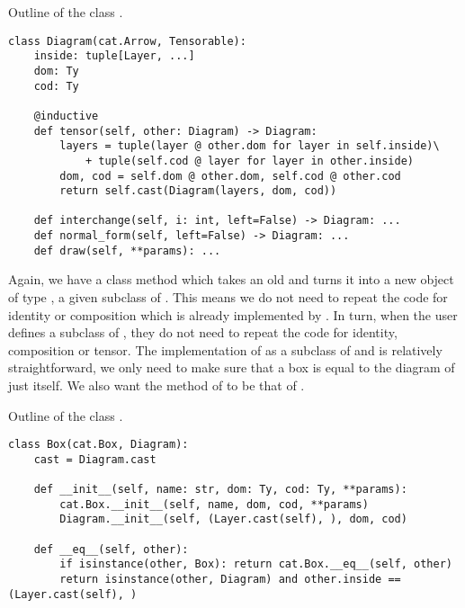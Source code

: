 \begin{python}\label{listing:monoidal.Diagram}
{\normalfont Outline of the class .}

\begin{verbatim}
class Diagram(cat.Arrow, Tensorable):
    inside: tuple[Layer, ...]
    dom: Ty
    cod: Ty

    @inductive
    def tensor(self, other: Diagram) -> Diagram:
        layers = tuple(layer @ other.dom for layer in self.inside)\
            + tuple(self.cod @ layer for layer in other.inside)
        dom, cod = self.dom @ other.dom, self.cod @ other.cod
        return self.cast(Diagram(layers, dom, cod))

    def interchange(self, i: int, left=False) -> Diagram: ...
    def normal_form(self, left=False) -> Diagram: ...
    def draw(self, **params): ...
\end{verbatim}
\end{python}

Again, we have a class method  which takes an old  and turns it into a new object of type , a given subclass of .
This means we do not need to repeat the code for identity or composition which is already implemented by \py{cat.Arrow}.
In turn, when the user defines a subclass of , they do not need to repeat the code for identity, composition or tensor.
The implementation of \py{monoidal.Box} as a subclass of \py{cat.Box} and  is relatively straightforward, we only need to make sure that a box is equal to the diagram of just itself.
We also want the \py{cast} method of \py{Box} to be that of \py{Diagram}.

\begin{python}
{\normalfont Outline of the class .}
\begin{verbatim}
class Box(cat.Box, Diagram):
    cast = Diagram.cast

    def __init__(self, name: str, dom: Ty, cod: Ty, **params):
        cat.Box.__init__(self, name, dom, cod, **params)
        Diagram.__init__(self, (Layer.cast(self), ), dom, cod)

    def __eq__(self, other):
        if isinstance(other, Box): return cat.Box.__eq__(self, other)
        return isinstance(other, Diagram) and other.inside == (Layer.cast(self), )
\end{verbatim}
\end{python}

